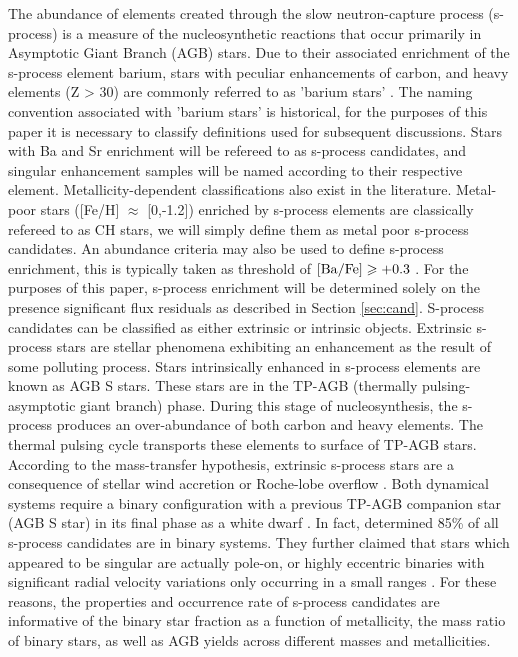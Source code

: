 \documentclass[a4paper,fleqn,usenatbib]{mnras}
\begin{document}
The abundance of elements created through the slow neutron-capture process (s-process) is a measure of the nucleosynthetic reactions that occur primarily in Asymptotic Giant Branch (AGB) stars. Due to their associated enrichment of the s-process element barium, stars with peculiar enhancements of carbon, and heavy elements (Z > 30) are commonly referred to as 'barium stars' \citep{Bidelman1951}. The naming convention associated with 'barium stars' is historical, for the purposes of this paper it is necessary to classify definitions used for subsequent discussions. Stars with Ba and Sr enrichment will be refereed to as s-process candidates, and singular enhancement samples will be named according to their respective element. Metallicity-dependent classifications also exist in the literature. Metal-poor stars ([Fe/H] $\approx$ [0,-1.2]) enriched by s-process elements are classically refereed to as CH stars, we will simply define them as metal poor s-process candidates. An abundance criteria may also be used to define s-process enrichment, this is typically taken as threshold of $\rm[Ba/Fe]\geq +0.3$ \citep{malaney1988}. For the purposes of this paper, s-process enrichment will be determined solely on the presence significant flux residuals as described in Section \ref{sec:cand}.
S-process candidates can be classified as either extrinsic or intrinsic objects. Extrinsic s-process stars are stellar phenomena exhibiting an enhancement as the result of some polluting process. Stars intrinsically enhanced in s-process elements are known as AGB S stars. These stars are in the TP-AGB (thermally pulsing-asymptotic giant branch) phase. During this stage of nucleosynthesis, the s-process produces an over-abundance of both carbon and heavy elements. The thermal pulsing cycle transports these elements to surface of TP-AGB stars. According to the mass-transfer hypothesis, extrinsic s-process stars are a consequence of stellar wind accretion \citep{boffin1988,jorissen1992} or Roche-lobe overflow \citep{webbink1986}. Both dynamical systems require a binary configuration with a previous TP-AGB companion star (AGB S star) in its final phase as a white dwarf \citep{bohm1980,bohm1984}. In fact, \citet{mcclure1983} determined 85\% of all s-process candidates are in binary systems. They further claimed that stars which appeared to be singular are actually pole-on, or highly eccentric binaries with significant radial velocity variations only occurring in a small ranges \citep{pourbaix2004}. For these reasons, the properties and occurrence rate of s-process candidates are informative of the binary star fraction as a function of metallicity, the mass ratio of binary stars, as well as AGB yields across different masses and metallicities. 
\end{document}
